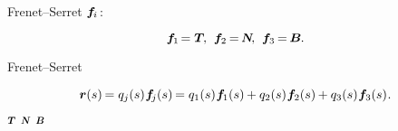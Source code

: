  Frenet\hbox{--}Serret   ${\bm{f}_{\hspace{-0.1ex}i}\hspace{.2ex}}$:

\nopagebreak\vspace{-0.2em}\begin{equation*}
\bm{f}_{\hspace{-0.1ex}1} \hspace{-.3ex} = \tangentvector\hspace{-0.2ex} ,
\hspace{.4em}
\bm{f}_{2} \hspace{-.2ex} = \hspace{-.2ex} \normalvector
\hspace{-0.2ex} ,
\hspace{.4em}
\bm{f}_{3} \hspace{-.2ex} = \hspace{-.2ex} \binormalvector\hspace{-0.1ex} .
\end{equation*}

 Frenet\hbox{--}Serret

\nopagebreak\vspace{-0.2em}\begin{equation*}
\locationvector(s) \hspace{-0.2ex}
= q_{j}(s) \hspace{.1ex} \bm{f}_{\hspace{-0.2ex}j}(s) \hspace{-0.2ex}
= q_{1}(s) \tikzmark{beginTangentUnitVector} \hspace{.1ex} \bm{f}_{\hspace{-0.1ex}1}(s) \tikzmark{endTangentUnitVector} \hspace{-0.1ex} + q_{2}(s) \tikzmark{beginNormalUnitVector} \hspace{.1ex} \bm{f}_{2}(s) \tikzmark{endNormalUnitVector} \hspace{-0.1ex} + q_{3}(s) \tikzmark{beginBinormalUnitVector} \hspace{.1ex} \bm{f}_{3}(s) \tikzmark{endBinormalUnitVector}
\hspace{.1ex} .
\end{equation*}%
%
{${\scalebox{.8}{$ \tangentvector $}}$}%
%
{${\scalebox{.8}{$ \normalvector $}}$}%
%
{${\scalebox{.8}{$ \binormalvector $}}$}%
\vspace{-0.5em}

